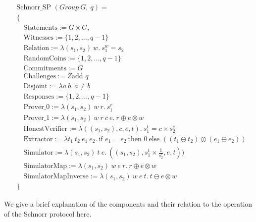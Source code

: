 \begin{align*}
    &\text{Schnorr\_SP } (Group \ G, \ q) =  \\
    &\{\\
    &\quad \text{Statements}:= G \times G, \\
    &\quad \text{Witnesses}:= \{1, 2, \ldots, q-1\} \\
    &\quad \text{Relation}:= \lambda (s_1, s_2) \ w. \ s_1^{w} = s_2 \\
    &\quad \text{RandomCoins}:= \{1, 2, \ldots, q-1\} \\
    &\quad \text{Commitments}:= G \\
    &\quad \text{Challenges}:= Z\text{add } q \\
    &\quad \text{Disjoint}:= \lambda a \ b. \ a \neq b \\
    &\quad \text{Responses}:= \{1, 2, \ldots, q-1\} \\
    &\quad \text{Prover\_0}:= \lambda (s_1, s_2) \ w \ r. \ s_1^{r} \\
    &\quad \text{Prover\_1}:= \lambda (s_1, s_2) \ w \ r \ c \ e. \ r \oplus e \otimes w \\
    &\quad \text{HonestVerifier}:= \lambda ((s_1, s_2), c, e, t). \ s_1^{t} = c \times s_2^{e} \\
    &\quad \text{Extractor}:= \lambda t_1 \ t_2 \ e_1 \ e_2. \ \text{if } e_1 = e_2 \ \text{then } 0 \ \text{else } ((t_1 \ominus t_2) \oslash (e_1 \ominus e_2)) \\
    &\quad \text{Simulator}:= \lambda (s_1, s_2) \ t \ e. \ ((s_1, s_2), s_1^{t} \times \frac{1}{s_2^{e}}, e ,t)) \\
    &\quad \text{SimulatorMap}:= \lambda (s_1, s_2) \ w \ e \ r. \ r \oplus e \otimes w \\
    &\quad \text{SimulatorMapInverse}:= \lambda (s_1, s_2) \ w \ e \ t. \ t \ominus e \otimes w \\
    &\}
\end{align*}

We give a brief explanation of the components and their relation to the operation of the Schnorr protocol here.

